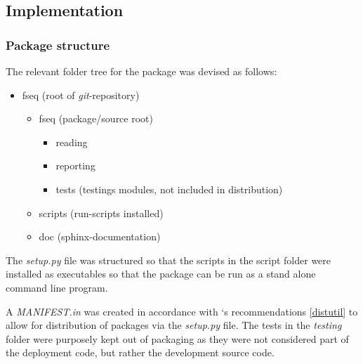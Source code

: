 \documentclass[letterpaper,10pt,english]{sphinxmanual}
\begin{document}
\subsection{Implementation}
\label{c3se_python_course:implementation}

\subsubsection{Package structure}
\label{c3se_python_course:package-structure}
The relevant folder tree for the package was devised as follows:
\begin{itemize}
\item {} 
fseq (root of \emph{git}-repository)
\begin{itemize}
\item {} 
fseq (package/source root)
\begin{itemize}
\item {} 
reading

\item {} 
reporting

\item {} 
tests (testings modules, not included in distribution)

\end{itemize}

\item {} 
scripts (run-scripts installed)

\item {} 
doc (sphinx-documentation)

\end{itemize}

\end{itemize}

The \emph{setup.py} file was structured so that the scripts in the script folder
were installed as executables so that the package can be run as a stand
alone command line program.

A \emph{MANIFEST.in} was created in accordance with `s recommendations
{\hyperref[c3se_python_course:distutil]{{[}distutil{]}}} to allow for distribution of packages via the \emph{setup.py} file.
The tests in the \emph{testing} folder were purposely kept out of packaging as they
were not considered part of the deployment code, but rather the development
source code.
\end{document}

